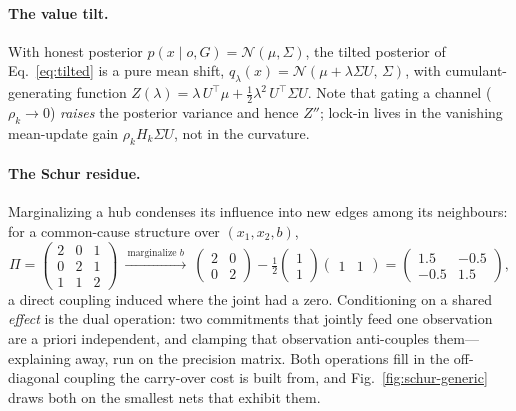 \documentclass[runningheads]{llncs}
\begin{document}
\paragraph{The value tilt.} With honest posterior $p(x\mid o,G)=\mathcal N(\mu,\Sigma)$, the tilted
posterior of Eq.~\eqref{eq:tilted} is a pure mean shift,
$q_\lambda(x)=\mathcal N(\mu+\lambda\Sigma U,\,\Sigma)$, with cumulant-generating function
$Z(\lambda)=\lambda\,U^{\!\top}\!\mu+\tfrac12\lambda^2\,U^{\!\top}\!\Sigma U$. Note that gating a
channel ($\rho_k\to0$) \emph{raises} the posterior variance and hence $Z''$; lock-in lives in the
vanishing mean-update gain $\rho_k H_k\Sigma U$, not in the curvature.

\paragraph{The Schur residue.} Marginalizing a hub condenses its influence into new edges among its
neighbours: for a common-cause structure over $(x_1,x_2,b)$,
\begin{equation}
\Pi=\begin{pmatrix}2&0&1\\0&2&1\\1&1&2\end{pmatrix}
\ \xrightarrow{\ \text{marginalize } b\ }\
\begin{pmatrix}2&0\\0&2\end{pmatrix}-\tfrac12\begin{pmatrix}1\\1\end{pmatrix}\begin{pmatrix}1&1\end{pmatrix}
=\begin{pmatrix}1.5&-0.5\\-0.5&1.5\end{pmatrix},
\label{eq:schur}
\end{equation}
a direct coupling induced where the joint had a zero. Conditioning on a shared \emph{effect} is the
dual operation: two commitments that jointly feed one observation are a priori independent, and
clamping that observation anti-couples them---explaining away, run on the precision matrix. Both
operations fill in the off-diagonal coupling the carry-over cost is built from, and
Fig.~\ref{fig:schur-generic} draws both on the smallest nets that exhibit them.
\end{document}
